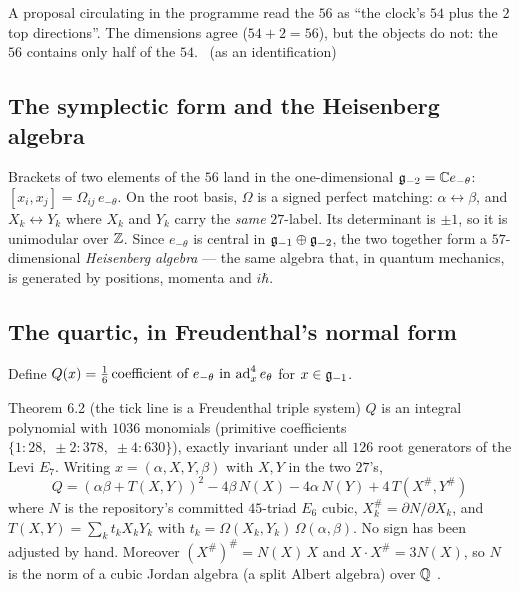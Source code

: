 \begin{boundary}
A proposal circulating in the programme read the $56$ as ``the clock's $54$ plus the $2$
top directions''. The dimensions agree ($54+2=56$), but the objects do not: the $56$
contains only half of the $54$. \tierX\ (as an identification)
\end{boundary}

\subsection{The symplectic form and the Heisenberg algebra}

Brackets of two elements of the $56$ land in the one-dimensional $\mathfrak{g}_{-2}=\mathbb{C} e_{-\theta}$:
$[x_i,x_j]=\Omega_{ij}\,e_{-\theta}$. On the root basis, $\Omega$ is a signed perfect
matching: $\alpha\leftrightarrow\beta$, and $X_k\leftrightarrow Y_k$ where $X_k$ and
$Y_k$ carry the \emph{same} $27$-label. Its determinant is $\pm1$, so it is unimodular
over $\mathbb{Z}$. Since $e_{-\theta}$ is central in $\mathfrak{g}_{-1}\oplus\mathfrak{g}_{-2}$, the two together form
a $57$-dimensional \emph{Heisenberg algebra} --- the same algebra that, in quantum
mechanics, is generated by positions, momenta and $i\hbar$. \tierC

\subsection{The quartic, in Freudenthal's normal form}

Define $Q(x)=\tfrac16\,\text{coefficient of }e_{-\theta}\text{ in }\mathrm{ad}_x^4\,e_\theta$ for
$x\in\mathfrak{g}_{-1}$.

\begin{result}{Theorem 6.2 (the tick line is a Freudenthal triple system) \hfill \tierC}
$Q$ is an integral polynomial with $1036$ monomials (primitive coefficients
$\{1\!:\!28,\;\pm2\!:\!378,\;\pm4\!:\!630\}$), exactly invariant under all $126$ root
generators of the Levi $E_7$. Writing $x=(\alpha,X,Y,\beta)$ with $X,Y$ in the two $27$'s,
\[
\boxed{\;Q=(\alpha\beta+T(X,Y))^2-4\beta\,N(X)-4\alpha\,N(Y)+4\,T(X^\#,Y^\#)\;}
\]
where $N$ is the repository's committed $45$-triad $E_6$ cubic, $X^\#_k=\partial N/\partial
X_k$, and $T(X,Y)=\sum_k t_kX_kY_k$ with $t_k=\Omega(X_k,Y_k)\,\Omega(\alpha,\beta)$. No sign
has been adjusted by hand. Moreover $(X^\#)^\#=N(X)\,X$ and $X\cdot X^\#=3N(X)$, so $N$ is
the norm of a cubic Jordan algebra (a split Albert algebra) over $\mathbb{Q}$ \cite{Krutelevich}.
\end{result}

